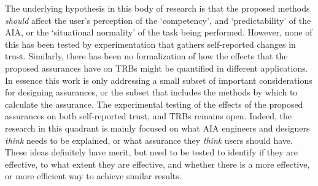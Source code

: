     The underlying hypothesis in this body of research is that the proposed methods \emph{should} affect the user's perception of the `competency', and `predictability' of the AIA, or the `situational normality' of the task being performed. However, none of this has been tested by experimentation that gathers self-reported changes in trust. Similarly, there has been no formalization of how the effects that the proposed assurances have on TRBs might be quantified in different applications. In essence this work is only addressing a small subset of important considerations for designing assurances, or the subset that includes the methods by which to calculate the assurance. The experimental testing of the effects of the proposed assurances on both self-reported trust, and TRBs remains open. Indeed, the research in this quadrant is mainly focused on what AIA engineers and designers \emph{think} needs to be explained, or what assurance they \emph{think} users should have. These ideas definitely have merit, but need to be tested to identify if they are effective, to what extent they are effective, and whether there is a more effective, or more efficient way to achieve similar results.
